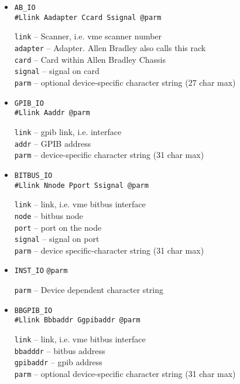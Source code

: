 \begin{description}
\begin{itemize}
\begin{itemize}
\item \verb|AB_IO| \\
\verb|#Llink Aadapter Ccard Ssignal @parm|

\verb|link| -- Scanner, i.e. vme scanner number \\
\verb|adapter| -- Adapter. Allen Bradley also calls this rack \\
\verb|card| -- Card within Allen Bradley Chassis \\
\verb|signal| -- signal on card \\
\verb|parm| -- optional device-specific character string (27 char max)

\item \verb|GPIB_IO| \\
\verb|#Llink Aaddr @parm|

\verb|link| -- gpib link, i.e. interface \\
\verb|addr| -- GPIB address \\
\verb|parm| -- device-specific character string (31 char max)

\item \verb|BITBUS_IO| \\
\verb|#Llink Nnode Pport Ssignal @parm|

\verb|link| -- link, i.e.  vme bitbus interface \\
\verb|node| -- bitbus node \\
\verb|port| -- port on the node \\
\verb|signal| -- signal on port \\
\verb|parm| -- device specific-character string (31 char max)

\item \verb|INST_IO|
\verb|@parm|

\verb|parm| -- Device dependent character string

\item \verb|BBGPIB_IO| \\
\verb|#Llink Bbbaddr Ggpibaddr @parm|

\verb|link| -- link, i.e. vme bitbus interface \\
\verb|bbadddr| -- bitbus address \\
\verb|gpibaddr| -- gpib address \\
\verb|parm| -- optional device-specific character string (31 char max)


\end{itemize}
\end{itemize}
\end{description}
